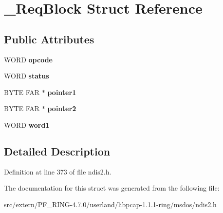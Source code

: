 \hypertarget{struct___req_block}{
\section{\_\-ReqBlock Struct Reference}
\label{struct___req_block}
}
\subsection*{Public Attributes}
\begin{DoxyCompactItemize}
\item 
\hypertarget{struct___req_block_ac6b19aeb675d189a34d032bbdac70a5f}{
WORD {\bfseries opcode}}
\label{struct___req_block_ac6b19aeb675d189a34d032bbdac70a5f}

\item 
\hypertarget{struct___req_block_a7a2cc18bf37aed68828db202982840f1}{
WORD {\bfseries status}}
\label{struct___req_block_a7a2cc18bf37aed68828db202982840f1}

\item 
\hypertarget{struct___req_block_ab6910aeb5d56e5c8bfd20670e788d7b1}{
BYTE FAR $\ast$ {\bfseries pointer1}}
\label{struct___req_block_ab6910aeb5d56e5c8bfd20670e788d7b1}

\item 
\hypertarget{struct___req_block_ad8e47fff290890fdd78da90da3cc24b8}{
BYTE FAR $\ast$ {\bfseries pointer2}}
\label{struct___req_block_ad8e47fff290890fdd78da90da3cc24b8}

\item 
\hypertarget{struct___req_block_ac0e74fd682443ad8066eaa5f39f078e1}{
WORD {\bfseries word1}}
\label{struct___req_block_ac0e74fd682443ad8066eaa5f39f078e1}

\end{DoxyCompactItemize}


\subsection{Detailed Description}


Definition at line 373 of file ndis2.h.



The documentation for this struct was generated from the following file:\begin{DoxyCompactItemize}
\item 
src/extern/PF\_\-RING-\/4.7.0/userland/libpcap-\/1.1.1-\/ring/msdos/ndis2.h\end{DoxyCompactItemize}
